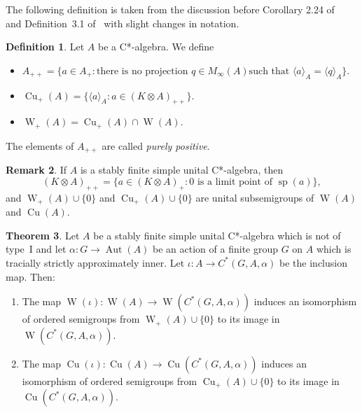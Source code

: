 \documentclass[10pt]{amsart}
\numberwithin{equation}{section}
\theoremstyle{definition}
\newtheorem{thm}{Theorem}[section]
\newtheorem{dfn}[thm]{Definition}
\newtheorem{rmk}[thm]{Remark}
\newcommand{\af}{\alpha}
\newcommand{\Cu}{{\operatorname{Cu}}}
\newcommand{\spec}{{\operatorname{sp}}}
\newcommand{\Aut}{{\operatorname{Aut}}}
\newcommand{\W}{{\operatorname{W}}}
\newcommand{\ca}{C*-algebra}
\newcommand{\CGAa}{C^* (G, A, \af)}
\begin{document}
%
The following definition is taken from the discussion before Corollary 2.24 of~\cite{APT11}
and Definition~3.1 of~\cite{Ph14}
with slight changes in notation.
%
\begin{dfn}\label{D_9421_Pure}
Let $A$ be a \ca.
We define
\begin{itemize}
\item
$A_{++} = \big\{ a \in A_{+} \colon
  \mbox{there is no projection $q \in M_{\infty} (A)$
         such that $\langle a \rangle_A = \langle q \rangle_A$} \big\}$.
\item
$\Cu_{+} (A)
 = \big\{ \langle a \rangle_A \colon a \in (K \otimes A)_{++} \}$.
\item
$\W_{+} (A)
 = \Cu_{+} (A) \cap \W (A)$.
\end{itemize}
The elements of $A_{++}$ are called {\emph{purely positive}}.
\end{dfn}
%
\begin{rmk} \label{RMK_Sta_si}
If $A$ is a stably finite  simple unital C*-algebra, then
\[
(K \otimes A)_{++}
  = \big\{ a \in (K \otimes A)_{+} \colon
   \mbox{$0$ is a limit point of $\spec (a)$} \big\},
\]
and $\W_{+} (A) \cup \{ 0 \}$ and $\Cu_{+} (A) \cup \{ 0 \}$
are unital subsemigroups of $\W (A)$ and $\Cu (A)$.
\end{rmk}   
%
\begin{thm}\label{WC_plus_injectivity}
Let $A$ be a stably finite simple unital \ca{} which is not of type~I
and let $\alpha \colon G \to \Aut (A)$
be an action of a finite group $G$ on $A$
which is tracially strictly approximately inner.
Let $\iota \colon A \to \CGAa$ be the inclusion map.
Then:
%
\begin{enumerate}
%
\item\label{WC_plus_injectivity_a}
The map $\W (\iota) \colon \W (A) \to \W (\CGAa)$
induces an isomorphism of ordered semigroups
from $\W_{+} (A) \cup \{ 0 \}$
to its image in $\W (\CGAa)$.
%
\item\label{WC_plus_injectivity_b}
The map $\Cu (\iota) \colon \Cu (A) \to \Cu (\CGAa)$
induces an isomorphism of ordered semigroups
from $\Cu_{+} (A) \cup \{ 0 \}$
to its image in $\Cu (\CGAa)$.
\end{enumerate}
%
\end{thm}
\end{document}
